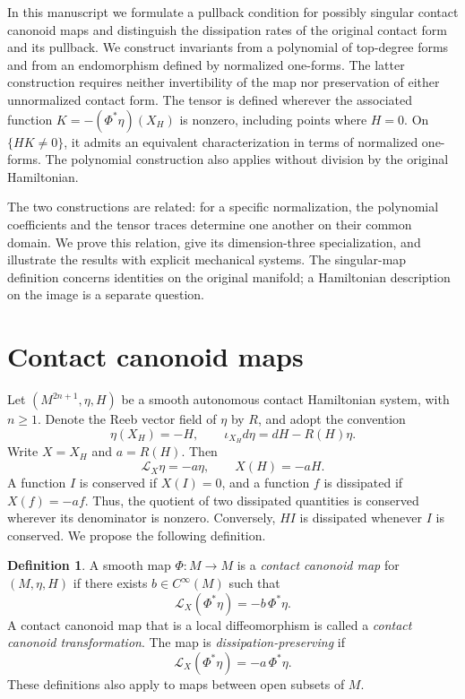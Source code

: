 \documentclass[11pt,a4paper]{article}
\numberwithin{equation}{section}
\theoremstyle{definition}
\newtheorem{definition}{Definition}
\theoremstyle{remark}
\begin{document}
In this manuscript we formulate a pullback condition for possibly singular contact
canonoid maps and distinguish the dissipation rates of the original
contact form and its pullback. We construct invariants from a polynomial
of top-degree forms and from an endomorphism defined by normalized
one-forms. The latter construction requires neither invertibility of
the map nor preservation of either unnormalized contact form. The tensor is defined wherever the associated function
$K=-(\Phi^*\eta)(X_H)$ is nonzero, including points where
$H=0$. On $\{HK\neq0\}$, it admits an equivalent
characterization in terms of normalized one-forms.
The polynomial construction also applies without division by the
original Hamiltonian.

The two constructions are related: for a specific normalization, the
polynomial coefficients and the tensor traces determine one another
on their common domain. We prove this relation, give its
dimension-three specialization, and illustrate the results with
explicit mechanical systems. The singular-map definition concerns
identities on the original manifold; a Hamiltonian description on
the image is a separate question.





\section{Contact canonoid maps}
\label{sec:maps}

Let $(M^{2n+1},\eta,H)$ be a smooth autonomous contact Hamiltonian
system, with $n\geq1$. Denote the Reeb vector field of $\eta$ by $R$,
and adopt the convention
\begin{equation}
\eta(X_H)=-H,\qquad
\iota_{X_H}d\eta=dH-R(H)\eta.
\label{eq:convention}
\end{equation}
Write $X=X_H$ and $a=R(H)$. Then
\begin{equation}
\mathcal L_X\eta=-a\eta,\qquad X(H)=-aH.
\label{eq:original-rate}
\end{equation}
A function $I$ is conserved if $X(I)=0$, and a function $f$ is
dissipated if $X(f)=-af$. Thus, the quotient of two dissipated
quantities is conserved wherever its denominator is nonzero.
Conversely, $HI$ is dissipated whenever $I$ is conserved. We propose the following definition.

\begin{definition}
A smooth map $\Phi:M\to M$ is a \emph{contact canonoid map} for $(M,\eta,H)$ if there exists $b\in C^\infty(M)$
such that
\begin{equation}
\mathcal L_X(\Phi^*\eta)=-b\,\Phi^*\eta.
\label{eq:canonoid}
\end{equation}
A contact canonoid map that is a local diffeomorphism is called a
\emph{contact canonoid transformation}. The map is
\emph{dissipation-preserving} if
\begin{equation}
\mathcal L_X(\Phi^*\eta)=-a\,\Phi^*\eta.
\label{eq:equal-rates}
\end{equation}
These definitions also apply to maps between open subsets of $M$.
\end{definition}
\end{document}

